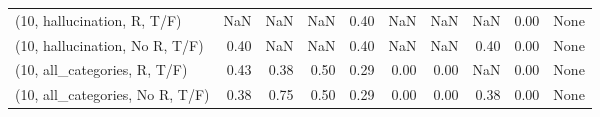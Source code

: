 \begin{table*}[h!]
\begin{adjustbox}{width=2\columnwidth,center}
\begin{tabular}{lrrr|rrr|rrr}
(10, hallucination, R, T/F)           &                       NaN &                   NaN &                       NaN &                          0.40 &                       NaN &                           NaN &                                    NaN &                               0.00 &                                  None \\
(10, hallucination, No R, T/F)        &                      0.40 &                   NaN &                       NaN &                          0.40 &                       NaN &                           NaN &                                   0.40 &                               0.00 &                                  None \\
(10, all\_categories, R, T/F)          &                      0.43 &                  0.38 &                      0.50 &                          0.29 &                      0.00 &                          0.00 &                                    NaN &                               0.00 &                                  None \\
(10, all\_categories, No R, T/F)       &                      0.38 &                  0.75 &                      0.50 &                          0.29 &                      0.00 &                          0.00 &                                   0.38 &                               0.00 &                                  None \\




\end{tabular}
\end{adjustbox}
\end{table*}
